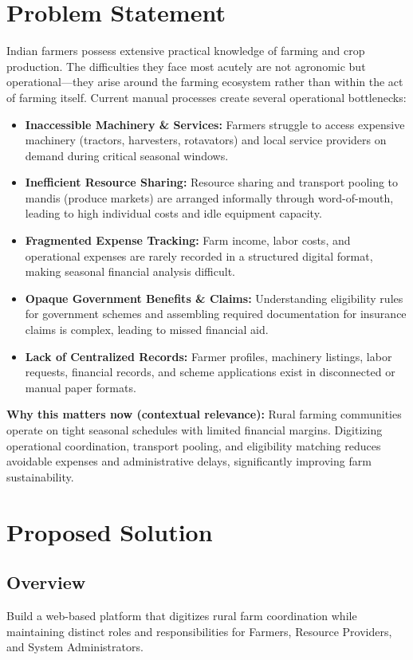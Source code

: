 \documentclass[11pt,a4paper]{article}
\begin{document}
\section{Problem Statement}
Indian farmers possess extensive practical knowledge of farming and crop production. The difficulties they face most acutely are not agronomic but operational---they arise around the farming ecosystem rather than within the act of farming itself. Current manual processes create several operational bottlenecks:
\begin{itemize}[leftmargin=*]
    \item \textbf{Inaccessible Machinery \& Services:} Farmers struggle to access expensive machinery (tractors, harvesters, rotavators) and local service providers on demand during critical seasonal windows.
    \item \textbf{Inefficient Resource Sharing:} Resource sharing and transport pooling to mandis (produce markets) are arranged informally through word-of-mouth, leading to high individual costs and idle equipment capacity.
    \item \textbf{Fragmented Expense Tracking:} Farm income, labor costs, and operational expenses are rarely recorded in a structured digital format, making seasonal financial analysis difficult.
    \item \textbf{Opaque Government Benefits \& Claims:} Understanding eligibility rules for government schemes and assembling required documentation for insurance claims is complex, leading to missed financial aid.
    \item \textbf{Lack of Centralized Records:} Farmer profiles, machinery listings, labor requests, financial records, and scheme applications exist in disconnected or manual paper formats.
\end{itemize}

\noindent \textbf{Why this matters now (contextual relevance):} Rural farming communities operate on tight seasonal schedules with limited financial margins. Digitizing operational coordination, transport pooling, and eligibility matching reduces avoidable expenses and administrative delays, significantly improving farm sustainability.

\section{Proposed Solution}

\subsection{Overview}
Build a web-based platform that digitizes rural farm coordination while maintaining distinct roles and responsibilities for Farmers, Resource Providers, and System Administrators.
\end{document}
